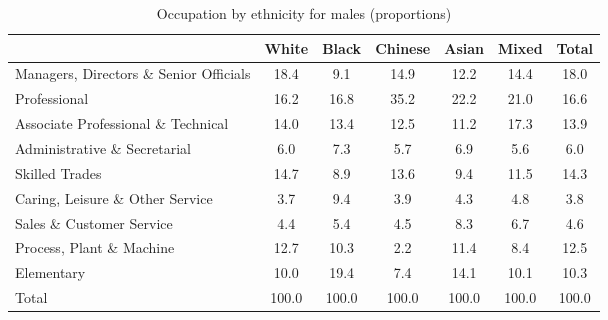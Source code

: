 \begin{table}[htbp]\centering
\def\sym#1{\ifmmode^{#1}\else\(^{#1}\)\fi}
\caption{Occupation by ethnicity for males (proportions)}
\begin{tabular}{l*{6}{c}}
\hline\hline
          &    White&    Black&  Chinese&    Asian&    Mixed&    Total\\
\hline
Managers, Directors \& Senior Officials         &     18.4&      9.1&     14.9&     12.2&     14.4&     18.0\\
Professional         &     16.2&     16.8&     35.2&     22.2&     21.0&     16.6\\
Associate Professional \& Technical         &     14.0&     13.4&     12.5&     11.2&     17.3&     13.9\\
Administrative \& Secretarial         &      6.0&      7.3&      5.7&      6.9&      5.6&      6.0\\
Skilled Trades          &     14.7&      8.9&     13.6&      9.4&     11.5&     14.3\\
Caring, Leisure \& Other Service         &      3.7&      9.4&      3.9&      4.3&      4.8&      3.8\\
Sales \& Customer Service         &      4.4&      5.4&      4.5&      8.3&      6.7&      4.6\\
Process, Plant \& Machine         &     12.7&     10.3&      2.2&     11.4&      8.4&     12.5\\
Elementary         &     10.0&     19.4&      7.4&     14.1&     10.1&     10.3\\
Total     &    100.0&    100.0&    100.0&    100.0&    100.0&    100.0\\
\hline\hline
\end{tabular}
\label{tab:occup_male}
\end{table}
